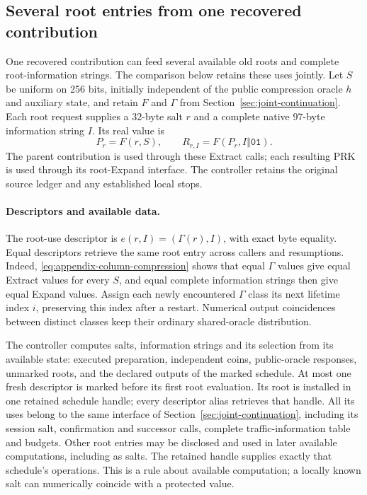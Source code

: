 \subsection{Several root entries from one recovered contribution}
\label{sec:multiple-root-entry}

One recovered contribution can feed several available old roots and complete
root-information strings. The comparison below retains these uses jointly.
Let $S$ be uniform on 256 bits, initially independent of the public compression
oracle $h$ and auxiliary state, and retain $F$ and $\Gamma$ from
Section~\ref{sec:joint-continuation}. Each root request supplies a 32-byte
salt $r$ and a complete native 97-byte information string $I$. Its real value is
\[
 P_r=F(r,S),\qquad R_{r,I}=F(P_r,I\Vert\mathtt{01}).
\]
The parent contribution is used through these Extract calls; each resulting
PRK is used through its root-Expand interface. The controller retains the
original source ledger and any established local stops.

\paragraph{Descriptors and available data.}
The root-use descriptor is
$e(r,I)=(\Gamma(r),I)$, with exact byte equality. Equal descriptors retrieve
the same root entry across callers and resumptions. Indeed,
\eqref{eq:appendix-column-compression} shows that equal $\Gamma$ values give
equal Extract values for every $S$, and equal complete information strings
then give equal Expand values. Assign each newly encountered $\Gamma$ class
its next lifetime index $i$, preserving this index after a restart.
Numerical output coincidences between distinct classes keep their ordinary
shared-oracle distribution.

The controller computes salts, information strings and its selection from
its available state: executed preparation, independent coins, public-oracle
responses, unmarked roots, and the declared outputs of the marked schedule.
At most one fresh descriptor is marked before its first root evaluation.
Its root is installed in one retained schedule handle; every descriptor alias
retrieves that handle. All its uses belong to the same interface of
Section~\ref{sec:joint-continuation}, including its session salt, confirmation
and successor calls, complete traffic-information table and budgets. Other
root entries may be disclosed and used in later available computations,
including as salts. The retained handle supplies exactly that schedule's
operations. This is a rule about available computation; a locally known salt
can numerically coincide with a protected value.

